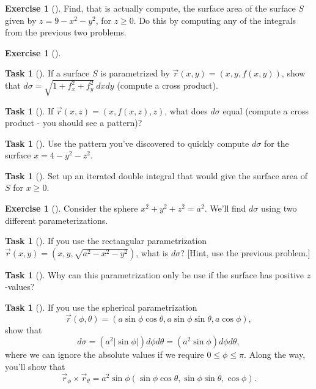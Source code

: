 \documentclass[10pt,]{book}
\theoremstyle{plain}
\theoremstyle{definition}
\theoremstyle{definition}
\theoremstyle{definition}
\theoremstyle{definition}
\newtheorem{exploration}[project]{Exercise}
\newtheorem{task}[project]{Task}
\theoremstyle{definition}
\numberwithin{equation}{section}
\begin{document}
\begin{exploration}[]\label{exploration-279}
Find, that is actually compute, the surface area of the surface \(S\) given by \(z=9-x^2-y^2\), for \(z\geq 0\). Do this by computing any of the integrals from the previous two problems.%
\end{exploration}
\begin{exploration}[]\label{exploration-280}
\begin{task}[]\label{task-756}
If a surface \(S\) is parametrized by \(\vec r(x,y) = (x,y,f(x,y))\), show that \(d\sigma = \sqrt{1+f_x^2+f_y^2}\ dxdy\) (compute a cross product).%
\end{task}
\begin{task}[]\label{task-757}
If \(\vec r(x,z) = (x,f(x,z),z)\), what does \(d\sigma\) equal (compute a cross product - you should see a pattern)?%
\end{task}
\begin{task}[]\label{task-758}
Use the pattern you've discovered to quickly compute \(d\sigma\) for the surface \(x=4-y^2-z^2\).%
\end{task}
\begin{task}[]\label{task-759}
Set up an iterated double integral that would give the surface area of \(S\) for \(x\geq 0\).%
\end{task}
\end{exploration}
\begin{exploration}[]\label{sphere_surface_area_element}
Consider the sphere \(x^2+y^2+z^2=a^2\). We'll find \(d\sigma\) using two different parameterizations.%
\begin{task}[]\label{task-760}
If you use the rectangular parametrization \(\vec r(x,y) = (x,y,\sqrt{a^2-x^2-y^2})\), what is \(d\sigma\)? [Hint, use the previous problem.]%
\end{task}
\begin{task}[]\label{task-761}
Why can this parametrization only be use if the surface has positive \(z\)-values?%
\end{task}
\begin{task}[]\label{task-762}
If you use the spherical parametrization%
\begin{equation*}
\vec r(\phi,\theta) = (a\sin\phi\cos\theta,a\sin\phi\sin\theta,a\cos\phi),
\end{equation*}
show that%
\begin{equation*}
d\sigma = (a^2|\sin\phi|)d\phi d\theta= (a^2\sin\phi) d\phi d\theta,
\end{equation*}
where we can ignore the absolute values if we require \(0\leq \phi\leq \pi\). Along the way, you'll show that%
\begin{equation*}
\vec r_\phi\times \vec r_\theta = a^2\sin \phi (\sin\phi\cos\theta,\sin\phi\sin\theta,\cos\phi).
\end{equation*}
%
\end{task}
\end{exploration}
\end{document}
